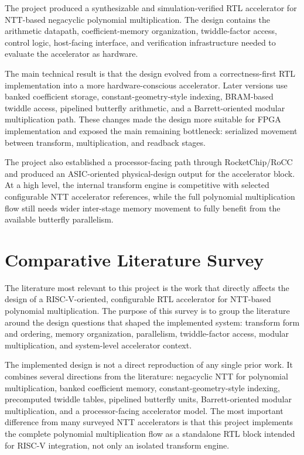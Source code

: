 \documentclass[a4paper, 12pt, titlepage]{article}
\begin{document}
The project produced a synthesizable and simulation-verified RTL accelerator
for NTT-based negacyclic polynomial multiplication. The design contains the
arithmetic datapath, coefficient-memory organization, twiddle-factor access,
control logic, host-facing interface, and verification infrastructure needed to
evaluate the accelerator as hardware.

The main technical result is that the design evolved from a correctness-first
RTL implementation into a more hardware-conscious accelerator. Later versions
use banked coefficient storage, constant-geometry-style indexing, BRAM-based
twiddle access, pipelined butterfly arithmetic, and a Barrett-oriented modular
multiplication path. These changes made the design more suitable for FPGA
implementation and exposed the main remaining bottleneck: serialized movement
between transform, multiplication, and readback stages.

The project also established a processor-facing path through RocketChip/RoCC
and produced an ASIC-oriented physical-design output for the accelerator block.
At a high level, the internal transform engine is competitive with selected
configurable NTT accelerator references, while the full polynomial
multiplication flow still needs wider inter-stage memory movement to fully
benefit from the available butterfly parallelism.
\newpage

\section{Comparative Literature Survey}

The literature most relevant to this project is the work that directly affects the design of a RISC-V-oriented, configurable RTL accelerator for NTT-based polynomial multiplication. The purpose of this survey is to group the literature around the design questions that shaped the implemented system: transform form and ordering, memory organization, parallelism, twiddle-factor access, modular multiplication, and system-level accelerator context.

The implemented design is not a direct reproduction of any single prior work. It combines several directions from the literature: negacyclic NTT for polynomial multiplication, banked coefficient memory, constant-geometry-style indexing, precomputed twiddle tables, pipelined butterfly units, Barrett-oriented modular multiplication, and a processor-facing accelerator model. The most important difference from many surveyed NTT accelerators is that this project implements the complete polynomial multiplication flow as a standalone RTL block intended for RISC-V integration, not only an isolated transform engine.
\end{document}
